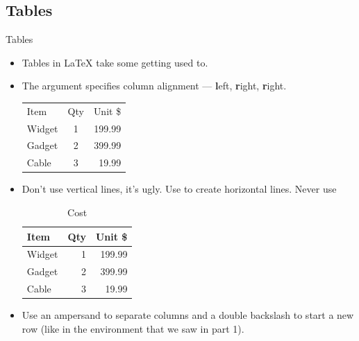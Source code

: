 \documentclass[10pt,times]{beamer}
\begin{document}
\subsection{Tables}
\begin{frame}[fragile]{Tables}
\begin{itemize}
\item Tables in \LaTeX{} take some getting used to.
\item The argument specifies column alignment --- \textbf{l}eft, 
\textbf{r}ight, \textbf{r}ight.
\begin{exampletwouptiny}
\begin{tabular}{lcr}
Item   & Qty & Unit \$ \\
Widget & 1   & 199.99  \\
Gadget & 2   & 399.99  \\
Cable  & 3   & 19.99   \\
\end{tabular}
\end{exampletwouptiny}
\item Don't use vertical lines, it's ugly. Use  to create 
horizontal lines. Never use 
\begin{exampletwouptiny}
\begin{table}[h]
\caption{Cost}
\begin{tabular}{lrr} \toprule
Item   & Qty & Unit \$ \\ \midrule
Widget & 1   & 199.99  \\
Gadget & 2   & 399.99  \\
Cable  & 3   & 19.99   \\ \bottomrule
\end{tabular}
\label{t:cost}
\end{table}
\end{exampletwouptiny}
\item Use an ampersand \keys{\&} to separate columns and a double 
backslash \keys{\bs}\keys{\bs} to start a new row (like in 
the  environment that we saw in part 1).
\end{itemize}
\end{frame}
\end{document}
